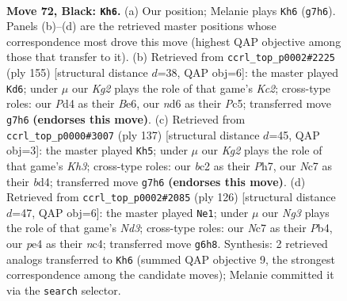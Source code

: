 \documentclass[11pt]{article}
\begin{document}
\clearpage

\begin{figure}[p]\centering
\begin{subfigure}{0.46\textwidth}\centering
\resizebox{\linewidth}{!}{%
\newchessgame
\chessboard[
  setfen={8/2n3k1/1b1N2n1/p7/P2pP3/1P5p/1KB1P3/8 b - - 11 72},
  showmover=false,
  pgfstyle=straightmove, color=movearrow, markmove={g7-h6}
]}
\caption{}
\end{subfigure}\hfill
\begin{subfigure}{0.46\textwidth}\centering
\resizebox{\linewidth}{!}{%
\newchessgame
\chessboard[
  setfen={8/2kn2p1/4b1Pp/1Pp4P/5K2/2N5/4B3/8 b - - 4 78},
  showmover=false,
  pgfstyle=straightmove, color=movearrow, markmove={c7-d6}
]}
\caption{}
\end{subfigure}
\\[4pt]
\begin{subfigure}{0.46\textwidth}\centering
\resizebox{\linewidth}{!}{%
\newchessgame
\chessboard[
  setfen={8/7p/2p4k/5p2/p2B1P2/P5K1/1Pb4P/8 b - - 22 69},
  showmover=false,
  pgfstyle=straightmove, color=movearrow, markmove={h6-h5}
]}
\caption{}
\end{subfigure}\hfill
\begin{subfigure}{0.46\textwidth}\centering
\resizebox{\linewidth}{!}{%
\newchessgame
\chessboard[
  setfen={8/2b2k2/1pp1p3/8/1PnPP3/2BN4/4K3/8 w - - 0 64},
  showmover=false,
  pgfstyle=straightmove, color=movearrow, markmove={d3-e1}
]}
\caption{}
\end{subfigure}
\caption{\textbf{Move 72, Black: \texttt{Kh6}.} (a) Our position; Melanie plays \texttt{Kh6} (\texttt{g7h6}). Panels (b)--(d) are the retrieved master positions whose correspondence most drove this move (highest QAP objective among those that transfer to it). (b) Retrieved from \texttt{ccrl\_top\_p0002\#2225} (ply 155) [structural distance $d$=38, QAP obj=6]: the master played \texttt{Kd6}; under $\mu$ our \emph{Kg2} plays the role of that game's \emph{Kc2}; cross-type roles: our \emph{P}d4 as their \emph{B}e6, our \emph{n}d6 as their \emph{P}c5; transferred move \texttt{g7h6} \textbf{(endorses this move)}. (c) Retrieved from \texttt{ccrl\_top\_p0000\#3007} (ply 137) [structural distance $d$=45, QAP obj=3]: the master played \texttt{Kh5}; under $\mu$ our \emph{Kg2} plays the role of that game's \emph{Kh3}; cross-type roles: our \emph{b}c2 as their \emph{P}h7, our \emph{N}c7 as their \emph{b}d4; transferred move \texttt{g7h6} \textbf{(endorses this move)}. (d) Retrieved from \texttt{ccrl\_top\_p0002\#2085} (ply 126) [structural distance $d$=47, QAP obj=6]: the master played \texttt{Ne1}; under $\mu$ our \emph{Ng3} plays the role of that game's \emph{Nd3}; cross-type roles: our \emph{N}c7 as their \emph{P}b4, our \emph{p}e4 as their \emph{n}c4; transferred move \texttt{g6h8}. Synthesis: 2 retrieved analogs transferred to \texttt{Kh6} (summed QAP objective 9, the strongest correspondence among the candidate moves); Melanie committed it via the \texttt{search} selector.}
\label{fig:thought-m143}
\end{figure}
\end{document}
